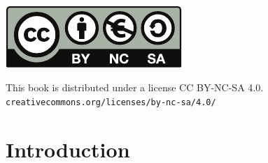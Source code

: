 \documentclass[fontsize=12pt]{scrartcl}
\begin{document}

\begin{titlepage}
	\noindent
	\setlength\fboxsep{0cm}
	\parbox[t]{\textwidth}{
			\raggedright
			\fontsize{50pt}{50pt}\selectfont\sffamily\color{white}{
			  \textbf{\subj}
      }
	}

	\vfill

	\noindent
	\parbox[b]{\textwidth}{
		\raggedright
		\sffamily\large\color{white}
		{\Large \autor }\\[4pt]
		\grado\\
		\universidad\\[4pt]
		\texttt{\enlaceweb}
	}

\end{titlepage}
\restorepagecolor


\thispagestyle{empty}
\null
\vfill

\noindent
\parbox[b]{0.7\textwidth}{
  \includegraphics{by-nc-sa.pdf}\\[4pt]
  \raggedright
  \sffamily
  {\large This book is distributed under a license CC BY-NC-SA 4.0.}\\[4pt]
  \texttt{creativecommons.org/licenses/by-nc-sa/4.0/}
}

\newpage

\thispagestyle{empty}
{\hypersetup{linkcolor=black}\tableofcontents}
\newpage


\part{Introduction}

\newpage
\end{document}
